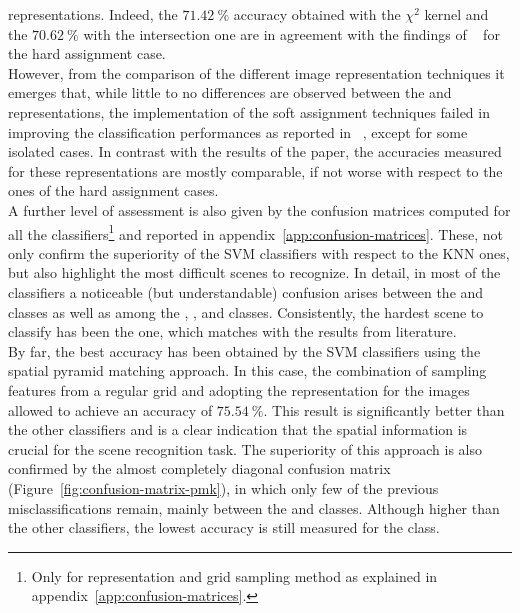 \documentclass[../main.tex]{subfiles}
\begin{document}
representations.
Indeed, the $\SI{71.42}{\percent}$ accuracy obtained with the $\chi^2$ kernel
and the $\SI{70.62}{\percent}$ with the intersection one are in agreement with
the findings of ~\cite{gemert} for the hard assignment
case.\\
However, from the comparison of the different image representation techniques it
emerges that, while little to no differences are observed between the
 and  representations, the implementation of the soft
assignment techniques failed in improving the classification performances as
reported in ~\cite{gemert}, except for some
isolated cases. In contrast with the results of the paper, the accuracies
measured for these representations are mostly comparable, if not worse with respect
to the ones of the hard assignment cases.\\
A further level of assessment is also given by the confusion matrices computed
for all the classifiers\footnote{Only for  representation and grid
	sampling method as explained in appendix~\ref{app:confusion-matrices}.} and reported in appendix~\ref{app:confusion-matrices}.
These, not only confirm the superiority of the SVM classifiers with respect to
the KNN ones, but also highlight the most difficult scenes to
recognize. In detail, in most of the classifiers a noticeable
(but understandable) confusion arises between the  and
 classes as well as among the , ,
 and  classes. Consistently, the hardest scene
to classify has been the  one, which matches with the results
from literature.\\
By far, the best accuracy has been obtained by the SVM classifiers
using the spatial pyramid matching approach. In this case, the combination of  sampling features
from a regular grid and adopting the  representation for the images
allowed to achieve an accuracy of $\SI{75.54}{\percent}$. This result is
significantly better than the other classifiers and is a clear indication that
the spatial information is crucial for the scene recognition task. The
superiority of this approach is also confirmed by the almost completely diagonal
confusion matrix (Figure~\ref{fig:confusion-matrix-pmk}), in which only few of
the previous misclassifications remain, mainly between the  and
 classes. Although higher than the other classifiers, the lowest
accuracy is still measured for the  class.\\
\end{document}
